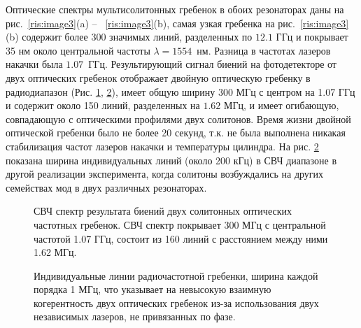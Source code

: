 Оптические спектры мультисолитонных гребенок в обоих резонаторах даны на рис.~\ref{ris:image3}(a) -- ~\ref{ris:image3}(b), самая узкая гребенка на рис.~\ref{ris:image3}(b) содержит более 300 значимых линий, разделенных по $12.1$ ГГц и покрывает 35 нм около центральной частоты $\lambda = 1554$~нм. Разница в частотах лазеров накачки была $1.07$~ГГц. Результирующий сигнал биений на фотодетекторе от двух оптических гребенок отображает двойную оптическую гребенку в радиодиапазон (Рис. \ref{ris:image4}, \ref{ris:dual_comb_individual_lines}), имеет общую ширину 300 МГц с центром на 1.07 ГГц и содержит около 150 линий, разделенных на $1.62$ МГц, и имеет огибающую, совпадающую с оптическими профилями двух солитонов. Время жизни двойной оптической гребенки было не более 20 секунд, т.к. не была выполнена никакая стабилизация частот лазеров накачки и температуры цилиндра. На рис. \ref{ris:dual_comb_individual_lines} показана ширина индивидуальных линий (около 200 кГц) в СВЧ диапазоне в другой реализации эксперимента, когда солитоны возбуждались на других семействах мод в двух различных резонаторах.

\begin{figure}[!htb]
\begin{minipage}{1\linewidth}
\end{minipage}
\caption{СВЧ спектр результата биений двух солитонных оптических частотных гребенок. СВЧ спектр покрывает 300 МГц с центральной частотой 1.07 ГГц, состоит из 160 линий с расстоянием между ними 1.62 МГц.}
\label{ris:image4}
\end{figure}

\begin{figure}[!htb]
\begin{minipage}{1\linewidth}
\end{minipage}
\caption{Индивидуальные линии радиочастотной гребенки, ширина каждой порядка 1 МГц, что указывает на невысокую взаимную когерентность двух оптических гребенок из-за использования двух независимых лазеров, не привязанных по фазе.}
\label{ris:dual_comb_individual_lines}
\end{figure}

